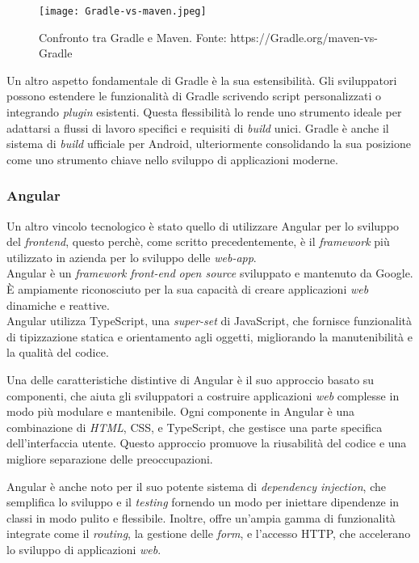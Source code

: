  \begin{figure}[!h] 
  \centering 
  \texttt{[image: Gradle-vs-maven.jpeg]} 
  \caption{Confronto tra Gradle e Maven. Fonte: https://Gradle.org/maven-vs-Gradle}
  \label{fig:gredle-vs-maven}
\end{figure}

Un altro aspetto fondamentale di Gradle è la sua estensibilità. Gli sviluppatori possono estendere le funzionalità di Gradle 
scrivendo script personalizzati o integrando \textit{plugin} esistenti. Questa flessibilità lo rende uno strumento ideale per adattarsi a 
flussi di lavoro specifici e requisiti di \textit{build} unici. Gradle è anche il sistema di \textit{build} ufficiale per Android, ulteriormente 
consolidando la sua posizione come uno strumento chiave nello sviluppo di applicazioni moderne.

\subsubsection*{Angular}
Un altro vincolo tecnologico è stato quello di utilizzare Angular per lo sviluppo del \textit{frontend}, 
questo perchè, come scritto precedentemente, è il \textit{framework} più utilizzato in azienda per lo sviluppo delle \textit{web-app}.\\

Angular è un \textit{framework} \textit{front-end} \textit{open source} sviluppato e mantenuto da Google. 
È ampiamente riconosciuto per la sua capacità di creare applicazioni \textit{web} dinamiche e reattive. \\
Angular utilizza TypeScript, una \textit{super-set} di JavaScript, che fornisce funzionalità di tipizzazione statica e 
orientamento agli oggetti, migliorando la manutenibilità e la qualità del codice.

Una delle caratteristiche distintive di Angular è il suo approccio basato su componenti, che aiuta gli sviluppatori a 
costruire applicazioni \textit{web} complesse in modo più modulare e mantenibile. Ogni componente in Angular è una combinazione di \textit{HTML}, 
CSS, e TypeScript, che gestisce una parte specifica dell'interfaccia utente. Questo approccio promuove la riusabilità 
del codice e una migliore separazione delle preoccupazioni.

Angular è anche noto per il suo potente sistema di \textit{dependency injection}, che semplifica lo sviluppo e il \textit{testing} fornendo un 
modo per iniettare dipendenze in classi in modo pulito e flessibile. Inoltre, offre un'ampia gamma di funzionalità integrate come il 
\textit{routing}, la gestione delle \textit{form}, e l'accesso HTTP, che accelerano lo sviluppo di applicazioni \textit{web}.

